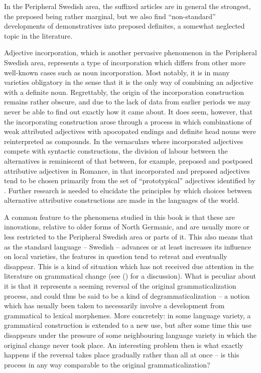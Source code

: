 In the Peripheral Swedish area, the suffixed articles are in general the strongest, the preposed being rather marginal, but we also find “non-standard” developments of demonstratives into preposed definites, a somewhat neglected topic in the literature. 

Adjective incorporation, which is another pervasive phenomenon in the Peripheral Swedish area, represents a type of incorporation which differs from other more well-known cases such as noun incorporation. Most notably, it is in many varieties obligatory in the sense that it is the only way of combining an adjective with a definite noun. Regrettably, the origin of the incorporation construction remains rather obscure, and due to the lack of data from earlier periods we may never be able to find out exactly how it came about. It does seem, however, that the incorporating construction arose through a process in which combinations of weak attributed adjectives with apocopated endings and definite head nouns were reinterpreted as compounds. In the vernaculars where incorporated adjectives compete with syntactic constructions, the division of labour between the alternatives is reminiscent of that between, for example, preposed and postposed attributive adjectives in Romance, in that incorporated and preposed adjectives tend to be chosen primarily from the set of “prototypical” adjectives identified by \citet{Dixon1977}. Further research is needed to elucidate the principles by which choices between alternative attributive constructions are made in the languages of the world.

A common feature to the phenomena studied in this book is that these are innovations, relative to older forms of North Germanic, and are usually more or less restricted to the Peripheral Swedish area or parts of it. This also means that as the standard language – Swedish – advances or at least increases its influence on local varieties, the features in question tend to retreat and eventually disappear. This is a kind of situation which has not received due attention in the literature on grammatical change (see (\citet{Dahl2004}) for a discussion). What is peculiar about it is that it represents a seeming reversal of the original grammaticalization process, and could thus be said to be a kind of degrammaticalization – a notion which has usually been taken to necessarily involve a development from grammatical to lexical morphemes. More concretely: in some language variety, a grammatical construction is extended to a new use, but after some time this use disappears under the pressure of some neighbouring language variety in which the original change never took place. An interesting problem then is what exactly happens if the reversal takes place gradually rather than all at once – is this process in any way comparable to the original grammaticalization?

